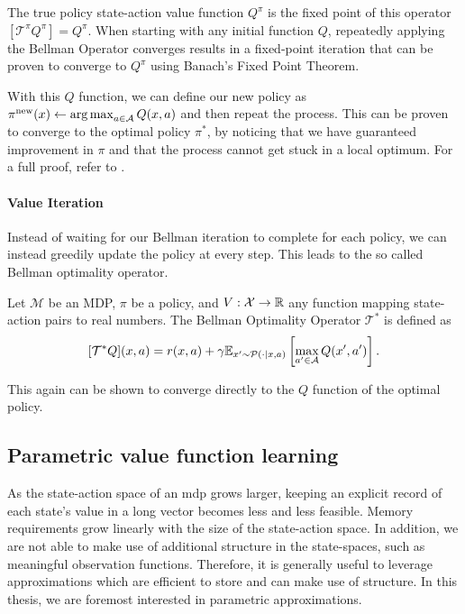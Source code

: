 The true policy state-action value function $Q^\pi$ is the fixed point of this operator $[\mathcal{T}^\pi Q^\pi] = Q^\pi$.
When starting with any initial function $Q$, repeatedly applying the Bellman Operator converges results in a fixed-point iteration that can be proven to converge to $Q^\pi$ using Banach's Fixed Point Theorem.

With this $Q$ function, we can define our new policy as $\pi^\mathrm{new}(x) \leftarrow \operatorname*{arg\,max}_{a\in\mathcal{A}} Q(x,a)$ and then repeat the process.
This can be proven to converge to the optimal policy $\pi^*$, by noticing that we have guaranteed improvement in $\pi$ and that the process cannot get stuck in a local optimum.
For a full proof, refer to \textcite{farahmand2021}.

\paragraph{Value Iteration}

Instead of waiting for our Bellman iteration to complete for each policy, we can instead greedily update the policy at every step.
This leads to the so called Bellman optimality operator.

\begin{definition}
    Let $\mathcal{M}$ be an MDP, $\pi$ be a policy, and $V: \mathcal{X} \rightarrow \mathbb{R}$ any function mapping state-action pairs to real numbers.
    The Bellman Optimality Operator $\mathcal{T}^*$ is defined as
    $$[\mathcal{T}^* Q](x,a) = r(x,a) + \gamma \mathbb{E}_{x'\sim \mathcal{P}(\cdot|x,a)}\left[\max_{a' \in \mathcal{A}}Q(x',a')\right].$$
\end{definition}

This again can be shown to converge directly to the $Q$ function of the optimal policy.

\subsection{Parametric value function learning}

As the state-action space of an \ac{mdp} grows larger, keeping an explicit record of each state's value in a long vector becomes less and less feasible.
Memory requirements grow linearly with the size of the state-action space.
In addition, we are not able to make use of additional structure in the state-spaces, such as meaningful observation functions.
Therefore, it is generally useful to leverage approximations which are efficient to store and can make use of structure.
In this thesis, we are foremost interested in parametric approximations.

